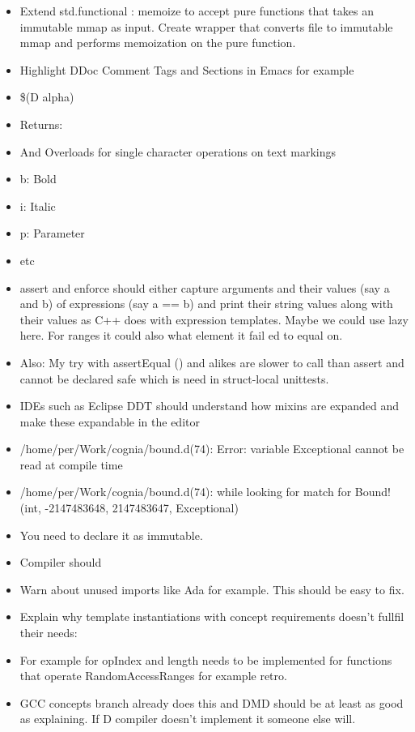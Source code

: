 \documentclass[xcolor=dvipsnames, twocolumn]{article}
\begin{document}
\begin{itemize}
\item Extend std.functional : memoize to accept pure functions that takes an
  immutable mmap as input. Create wrapper that converts file to immutable mmap
  and performs memoization on the pure function.
\item Highlight DDoc Comment Tags and Sections in Emacs for example
\item \$(D alpha)
\item Returns:
\item And Overloads for single character operations on text markings
\item b: Bold
\item i: Italic
\item p: Parameter
\item etc
\item assert and enforce should either capture arguments and their values (say a
  and b) of expressions (say a == b) and print their string values along with
  their values as C++ does with expression templates. Maybe we could use lazy
  here. For ranges it could also what element it fail ed to equal on.
\item Also: My try with assertEqual () and alikes are slower to call than assert
  and cannot be declared safe which is need in struct-local unittests.
\item IDEs such as Eclipse DDT should understand how mixins are expanded and
  make these expandable in the editor
\item /home/per/Work/cognia/bound.d(74): Error: variable Exceptional cannot be
  read at compile time
\item /home/per/Work/cognia/bound.d(74): while looking for match for Bound!(int,
  -2147483648, 2147483647, Exceptional)
\item You need to declare it as immutable.
\item Compiler should
\item Warn about unused imports like Ada for example. This should be easy to
  fix.
\item Explain why template instantiations with concept requirements doesn’t
  fullfil their needs:
\item For example for opIndex and length needs to be implemented for functions
  that operate RandomAccessRanges for example retro.
\item GCC concepts branch already does this and DMD should be at least as good
  as explaining. If D compiler doesn’t implement it someone else will.
\end{itemize}
\end{document}
